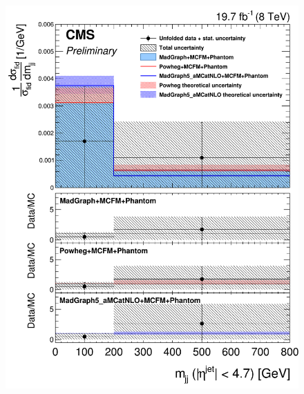 \begin{figure}[hbtp]
\begin{center}
    \includegraphics[width=\cmsFigWidth]{Figures/DiffCrossSecZZTo2e2mMjj_Unfolded_fr_MadGraph_norm.png}       

\end{center}
\end{figure}
